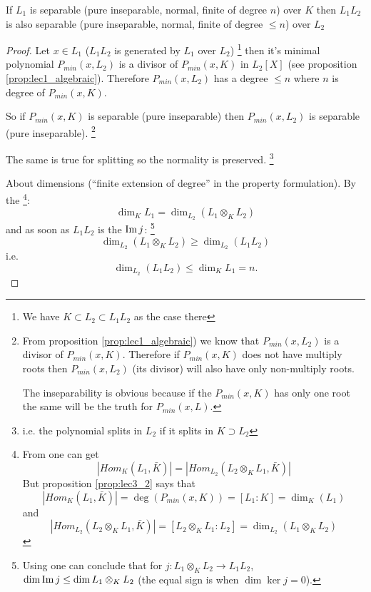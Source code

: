 \begin{property}
  If $L_1$ is separable (pure inseparable, normal, finite of
  degree $n$) over $K$ then $L_1 L_2$ is also separable (pure
  inseparable, normal, finite of degree $ \le n$) over $L_2$
  \begin{proof}
    Let $x \in L_1$ ($L_1 L_2$ is generated by $L_1$ over $L_2$)
    \footnote{
      We have $K \subset L_2 \subset L_1 L_2$ as the case there
    }
    then it's minimal polynomial $P_{min}\left(x, L_2\right)$ is a
    divisor of $P_{min}\left(x, K\right)$ in
    $L_2\left[X\right]$ (see proposition \ref{prop:lec1_algebraic}). 
    Therefore $P_{min}\left(x, L_2\right)$ has a
    degree $\le n$ where $n$ 
    is degree of $P_{min}\left(x, K\right)$.

    So if $P_{min}\left(x, K\right)$ is separable (pure inseparable)
    then $P_{min}\left(x, L_2\right)$ is separable (pure inseparable).
    \footnote{
      From proposition \ref{prop:lec1_algebraic}) we know that
      $P_{min}\left(x, L_2\right)$ is a divisor of $P_{min}\left(x,
      K\right)$. Therefore if $P_{min}\left(x, K\right)$ does not have
      multiply roots then $P_{min}\left(x, L_2\right)$ (its divisor)
      will also have only non-multiply roots.

      The inseparability is obvious because if the
      $P_{min}\left(x,K\right)$ has only one root the same will be the
      truth for $P_{min}\left(x, L\right)$.
    }

    The same is true for splitting so the normality is preserved.
    \footnote{
      i.e. the polynomial splits in $L_2$ if it splits in $K \supset L_2$
    }

    About dimensions (``finite extension of degree'' in the property
    formulation). By the 
    \footnote{
      From  one can get
      \[
      \left|Hom_K\left(L_1, \bar{K}\right)\right| =
      \left|Hom_{L_2}\left(L_2 \otimes_K L_1, \bar{K}\right)\right|
      \]
      But proposition \ref{prop:lec3_2}
      says that
      \[
      \left|Hom_K\left(L_1, \bar{K}\right)\right| =
      \deg\left(P_{min}\left(x,K\right)\right) =
      \left[L_1 : K\right] = 
      \dim_K\left(L_1\right)
      \]
      and
      \[
      \left|Hom_{L_2}\left(L_2 \otimes_K L_1, \bar{K}\right)\right| =
      \left[L_2 \otimes_K L_1 : L_2\right] = 
      \dim_{L_2}\left(L_1 \otimes_K L_2 \right)
      \]
    }: 
    \[
    \dim_K L_1 = \dim_{L_2}\left(L_1 \otimes_K L_2\right)
    \]
    and as soon as $L_1 L_2$ is the $\operatorname{Im} j$:
    \footnote{
      Using  one can conclude that for
      $j: L_1 \otimes_K L_2 \to L_1L_2$,
      $\dim{\operatorname{Im}j} \le \dim{L_1\otimes_K L_2}$
      (the equal sign is when $\dim{\ker{j}} = 0$).
    }
    \[
    \dim_{L_2}\left(L_1 \otimes_K L_2\right) \ge
    \dim_{L_2}\left(L_1 L_2\right)
    \]
    i.e.
    \[
    \dim_{L_2}\left(L_1 L_2\right) \le \dim_K L_1 = n.
    \]
  \end{proof}
  \label{property:lec7_1}
\end{property}

